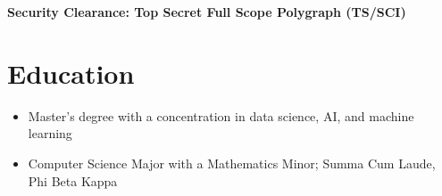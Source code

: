 \documentclass{my_cv}
\begin{document}
\makecvtitle
\centerline{\textbf{Security Clearance: Top Secret Full Scope Polygraph (TS/SCI)}}


\section{Education \faBook} 
\begin{itemize}
\item Master's degree with a concentration in data science, AI, and machine
  learning
\end{itemize}
\begin{itemize}
\item Computer Science Major with a Mathematics Minor;  Summa
  Cum Laude, Phi Beta Kappa
\end{itemize}
\end{document}
